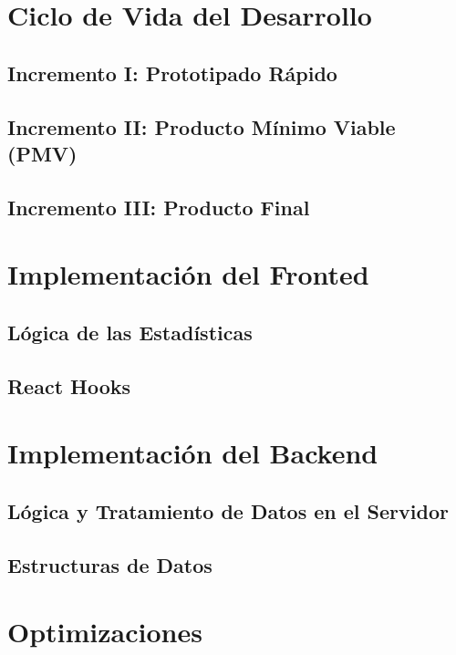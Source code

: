 \section{Ciclo de Vida del Desarrollo}

\subsection{Incremento I: Prototipado Rápido}

\subsection{Incremento II: Producto Mínimo Viable (PMV)}

\subsection{Incremento III: Producto Final}

\section{Implementación del Fronted}

\subsection{Lógica de las Estadísticas}

\subsection{React Hooks}

\section{Implementación del Backend}

\subsection{Lógica y Tratamiento de Datos en el Servidor}

\subsection{Estructuras de Datos}

\section{Optimizaciones}